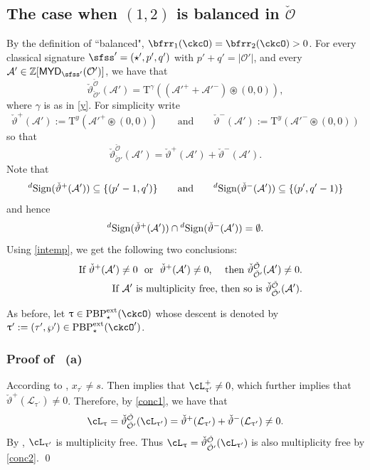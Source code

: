 \documentclass[11pt,a4paper]{amsart}
\def\MYD{{\mathsf{MYD}}}
\def\abs#1{\left|{#1}\right|}
\newcommand{\CA}{{\mathcal {A}}}
\newcommand{\CO}{{\mathcal {O}}}
\newcommand{\Z}{\mathbb{Z}}
\newcommand{\be}{\begin {equation}}
\newcommand{\ee}{\end {equation}}
\numberwithin{equation}{section}
\theoremstyle{remark}
\def\subset{\subseteq}
\def\PBPes{\mathrm{PBP}^{\mathrm{ext}}_{\star}}
\def\uptaup{\uptau^{\prime}}
\def\taup{\tau^{\prime}}
\def\maltese{\mathrm{T}}
\def\MYD{{\mathsf{MYD}}}
\def\pac#1{\ac_{#1}^+}
\def\ac{\cL}
\begin{document}
\subsection*{The case when $(1,2)$ is balanced in $\check \CO$} By the definition of ``balanced", $\bfrr_{1}(\ckcO)=\bfrr_{2}(\ckcO)>0$.
For every classical signature $\sfss'=(\star', p',q')$ with $p'+q'=\abs{\CO'}$, and every  $\CA'\in \Z[\MYD_{\sfss'}(\CO')]$, we have that
 \be\label{tlcc2}
 \check{\vartheta}_{\check \CO'}^{\check \CO}(\CA')= \maltese^{\gamma} ((\CA'^+ + \CA'^-)\circledast (0,0)  ),
  \ee
where $\gamma$ is as in \eqref{y}. For simplicity write
\[
\check \vartheta^+(\CA'):=\maltese^{y} (\CA'^+\circledast (0,0)  )\qquad\textrm{and}\qquad \check \vartheta^-(\CA'):=\maltese^{y} (\CA'^-\circledast (0,0)  )
\]
so that
   \[
  \check{\vartheta}_{\check \CO'}^{\check \CO}(\CA')=\check \vartheta^+(\CA')+\check \vartheta^-(\CA').
    \]
Note that
\[
  \dsign(\check{\vartheta}^+(\CA'))\subset\{(p'-1,q')\}\qquad \textrm{and}\qquad
  \dsign(\check{\vartheta}^-(\CA'))\subset\{(p',q'-1)\}
\]
and hence
\be\label{intemp}
\dsign(\check{\vartheta}^+(\CA'))\cap
  \dsign(\check{\vartheta}^-(\CA'))=\emptyset.
\ee
Using \eqref{intemp}, we get the following two conclusions:
\begin{eqnarray}
\label{conc1}
  &&\textrm{If $\check{\vartheta}^+(\CA')\neq 0\ $ or  $\ \check{\vartheta}^+(\CA')\neq 0$, $\ \ $ then $\check{\vartheta}_{\check \CO'}^{\check \CO}(\CA')\neq 0$.}\smallskip \\
  \label{conc2}
  &&\textrm{If $\CA'$ is multiplicity free, then so is   $\check{\vartheta}_{\check \CO'}^{\check \CO}(\CA')$.}
\end{eqnarray}

As before, let $\uptau\in \PBPes(\ckcO)$ whose descent is denoted by $\uptau':=(\tau',\wp')\in \PBPes(\ckcO')$.
\subsubsection*{Proof of ~(a)}
According to ,  $x_{\taup}\neq s$.
Then   implies that  $\pac{\uptaup} \neq 0$, which further implies that $\check{\vartheta}^+ (\mathcal L_{\uptaup})\neq 0$.
Therefore, by \eqref{conc1}, we have that
\[
\ac_{\uptau}=\check{\vartheta}_{\check \CO'}^{\check \CO}(\ac_{\uptau'})=\check{\vartheta}^+ (\mathcal L_{\uptaup})+\check{\vartheta}^- (\mathcal L_{\uptaup})\neq 0.
\]By , $\ac_{\uptau'}$ is multiplicity free. Thus $\ac_{\uptau}=\check{\vartheta}_{\check \CO'}^{\check \CO}(\ac_{\uptau'})$ is also multiplicity free by \eqref{conc2}. \qed
\end{document}

